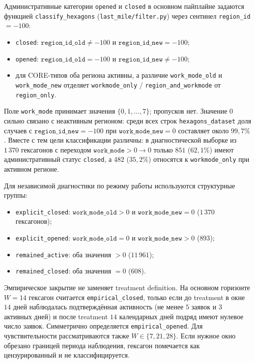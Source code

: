 \documentclass[14pt,a4paper]{extarticle}
\begin{document}
Административные категории \texttt{opened} и \texttt{closed} в основном пайплайне задаются функцией \texttt{classify\_hexagons} (\texttt{last\_mile/filter.py}) через сентинел \texttt{region\_id} \(= -100\):
\begin{itemize}
    \item \texttt{closed}: \(\texttt{region\_id\_old} \neq -100\) и \(\texttt{region\_id\_new} = -100\);
    \item \texttt{opened}: \(\texttt{region\_id\_old} = -100\) и \(\texttt{region\_id\_new} \neq -100\);
    \item для CORE-типов оба региона активны, а различие \texttt{work\_mode\_old} и \texttt{work\_mode\_new} отделяет \texttt{workmode\_only} / \texttt{region\_and\_workmode} от \texttt{region\_only}.
\end{itemize}
Поле \texttt{work\_mode} принимает значения \(\{0,1,\ldots,7\}\); пропусков нет. Значение \(0\) сильно связано с неактивным регионом: среди всех строк \texttt{hexagons\_dataset} доля случаев с \(\texttt{region\_id\_new}=-100\) при \(\texttt{work\_mode\_new}=0\) составляет около \(99{,}7\%\). Вместе с тем цели классификации различны: в диагностической выборке из \(1\,370\) гексагонов с переходом \(\texttt{work\_mode}>0\to 0\) только \(851\) (\(62{,}1\%\)) имеют административный статус \texttt{closed}, а \(482\) (\(35{,}2\%\)) относятся к \texttt{workmode\_only} при активном регионе.

Для независимой диагностики по режиму работы используются структурные группы:
\begin{itemize}
    \item \texttt{explicit\_closed}: \(\texttt{work\_mode\_old}>0\) и \(\texttt{work\_mode\_new}=0\) (\(1\,370\) гексагонов);
    \item \texttt{explicit\_opened}: \(\texttt{work\_mode\_old}=0\) и \(\texttt{work\_mode\_new}>0\) (\(893\));
    \item \texttt{remained\_active}: оба значения \(>0\) (\(11\,961\));
    \item \texttt{remained\_closed}: оба значения \(=0\) (\(608\)).
\end{itemize}

Эмпирическое закрытие не заменяет treatment definition. На основном горизонте \(W=14\) гексагон считается \texttt{empirical\_closed}, только если до treatment в окне \(14\) дней наблюдалась подтверждённая активность (не менее \(5\) заявок и \(3\) активных дней) и после treatment \(14\) календарных дней подряд имеют нулевое число заявок. Симметрично определяется \texttt{empirical\_opened}. Для чувствительности рассматриваются также \(W\in\{7,21,28\}\). Если нужное окно обрезано границей периода наблюдения, гексагон помечается как цензурированный и не классифицируется.
\end{document}
